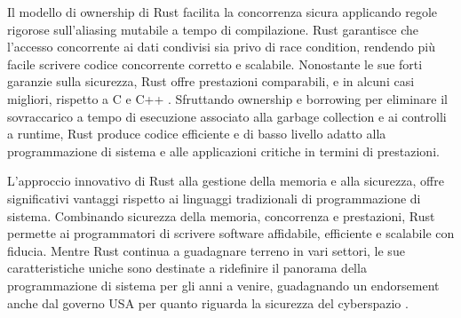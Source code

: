 Il modello di ownership di Rust facilita la concorrenza sicura applicando regole rigorose sull'aliasing mutabile a tempo di compilazione. Rust garantisce che l'accesso concorrente ai dati condivisi sia privo di race condition, rendendo più facile scrivere codice concorrente corretto e scalabile.
Nonostante le sue forti garanzie sulla sicurezza, Rust offre prestazioni comparabili, e in alcuni casi migliori, rispetto a C e C++ \cite[]{Rust:bench}. Sfruttando ownership e borrowing per eliminare il sovraccarico a tempo di esecuzione associato alla garbage collection e ai controlli a runtime, Rust produce codice efficiente e di basso livello adatto alla programmazione di sistema e alle applicazioni critiche in termini di prestazioni.

L'approccio innovativo di Rust alla gestione della memoria e alla sicurezza, offre significativi vantaggi rispetto ai linguaggi tradizionali di programmazione di sistema. Combinando sicurezza della memoria, concorrenza e prestazioni, Rust permette ai programmatori di scrivere software affidabile, efficiente e scalabile con fiducia. Mentre Rust continua a guadagnare terreno in vari settori, le sue caratteristiche uniche sono destinate a ridefinire il panorama della programmazione di sistema per gli anni a venire, guadagnando un endorsement anche dal governo USA per quanto riguarda la sicurezza del cyberspazio \cite[]{Gov:rust_use}.